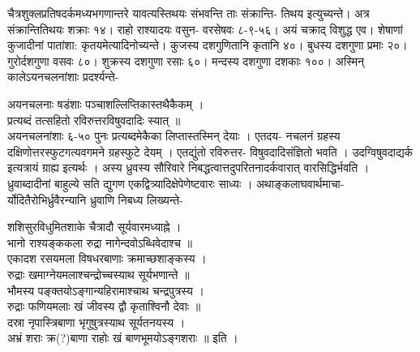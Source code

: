 \documentclass[11pt, openany]{book}
\begin{document}
{{{{\vspace{1mm}
\justifying
 चैत्रशुक्लप्रतिषदर्कमध्यभगणान्तरे यावत्यस्तिथयः संभवन्ति ताः
संक्रान्ति-
तिथय इत्युच्यन्ते। अत्र संक्रान्तितिथयः शक्राः १४। राहो राश्यादयः
वसुन-
वरसेषवः ८-९-५६। अयं चक्राद् विशुद्ध एव। शेषाणां कुजादीनां पातांशा:
कृतयमेत्यादिनोच्यन्ते। कुजस्य दशगुणितानि कृतानि ४०। बुधस्य दशगुणा
प्रमाः २०। गुरोर्दशगुणा वसवः ८०। शुक्रस्य दशगुणा रसाः ६०।
मन्दस्य
दशगुणा दशकाः १००। अस्मिन् कालेऽयनचलनांशाः प्रदर्श्यन्ते-


\newpage
\centering
 अयनचलनाः षडंशाः पञ्चाशल्लिप्तिकास्तथैकैकम् ।\\ 
 प्रत्यब्दं तत्सहितो रविरुत्तरविषुवदादिः स्यात् ॥ \\
\vspace{2mm}
\justifying
 अयनचलनांशाः ६-५० पुनः प्रत्यब्दमेकैका लिप्तास्तस्मिन् देयाः ।
एतदय-
नचलनं ग्रहस्य दक्षिणोत्तरस्फुटगत्यवगमने ग्रहस्फुटे देयम् । एतद्युंतो
रविरुत्तर-
विषुवदादिसंज्ञितो भवति । उदग्विषुवदाद्यर्क इत्यत्रायं ग्राह्य इत्यर्थः
। अस्य 
ध्रुवस्य सौरिवारे निबद्धत्वात्तदुपरितनादर्कवारात् वारसिद्धिर्भवति ।
ध्रुवाब्दादीनां 
बाहुल्ये सति द्युगण एकद्वित्र्यादिक्षेपेणेष्टवारः साध्यः ।
अथाङ्कलाघवार्थमाचा-
र्योदितैरोभिर्ध्रुवैरन्यानि ध्रुवाणि निबध्य लिख्यन्ते- 

\vspace{2mm}
\centering
 शशिसुरविधुमितशाके चैत्रादौ सूर्यवारमध्याह्ने । \\
 भानो राश्यङ्ककला रुद्रा नागेन्दवोऽब्धिवेदाश्च ॥ \\
 \hspace{0.7cm}
 एकादश रसयमला विषधरबाणाः क्रमाच्छशाङ्कस्य । \\
 रुद्राः खमाग्नेयमलाश्चन्द्रोच्चस्याथ सूर्यभणान्ते ॥ \\
 भौमस्य पङ्क्तयोऽङ्गान्यहिरामाश्चाथ चन्द्रपुत्रस्य ।\\
\hspace{0.9cm}
 रुद्राः फणियमलाः खं जीवस्य द्वौ कृताश्विनौ देवाः ॥ \\
 दस्रा नृपास्त्रिबाणा भृगुषुत्रस्याथ सूर्यतनयस्य । \\
\hspace{2cm}
 अभ्रं शराः क्र(?)बाणा राहोः खं बाणभूमयोऽङ्गशराः ॥ इति । 

}}}}
\end{document}
